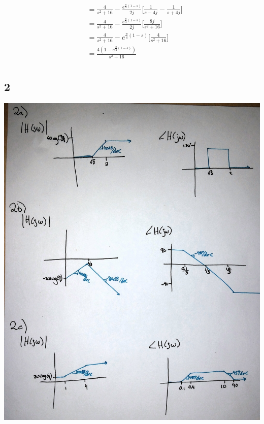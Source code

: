 \documentclass[12pt]{article}
\begin{document}
\begin{enumerate}[a)]
\begin{align*}
                &=\frac{4}{s^2 + 16} - \frac{e^{\frac{\pi}{4}(1-s)}}{2j} \bigg[\frac{1}{s-4j} - \frac{1}{s+4j}\bigg]\\
                &=\frac{4}{s^2 + 16} - \frac{e^{\frac{\pi}{4}(1-s)}}{2j} \bigg[\frac{8j}{s^2+16}\bigg]\\
                &=\frac{4}{s^2 + 16} - e^{\frac{\pi}{4}(1-s)} \bigg[\frac{4}{s^2+16}\bigg]\\
                &=\frac{4 (1- e^{\frac{\pi}{4}(1-s)})}{s^2 + 16}\\
        \end{align*}
\end{enumerate}

\subsection*{2}
\includegraphics[width=15cm]{2.jpg}
\end{document}

